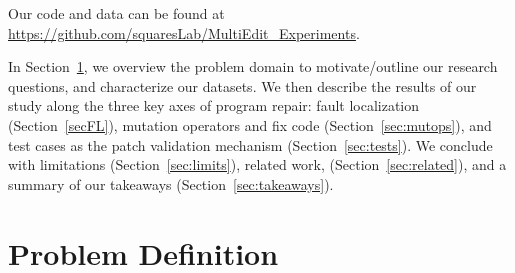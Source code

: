 \documentclass[10pt,journal,compsoc]{IEEEtran}
\begin{document}
Our code and data can be found at 
\url{https://github.com/squaresLab/MultiEdit_Experiments}.

In Section~\ref{sec:background}, we overview the problem domain to
motivate/outline our research questions, and characterize our datasets.
We then describe the results of our study along the
three key axes of program repair: fault localization (Section~\ref{secFL}),
mutation operators and fix code (Section~\ref{sec:mutops}), and test cases as
the patch validation mechanism (Section~\ref{sec:tests}).  We conclude with
limitations (Section~\ref{sec:limits}), related work,
(Section~\ref{sec:related}), and a summary of
our takeaways (Section~\ref{sec:takeaways}).

\section{Problem Definition}
\label{sec:background}
\end{document}
